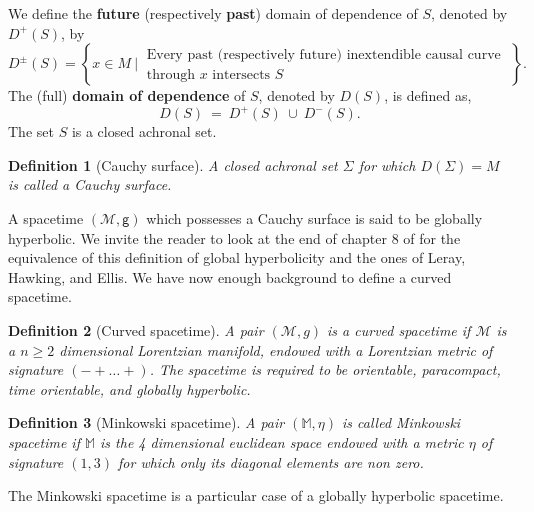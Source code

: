 \documentclass[11pt]{book}
\newcommand{\Mcal}{\mathcal{M}}
\newcommand{\Mbb}{\mathbb{M}}
\newcommand{\gsf}{\mathsf{g}}
\theoremstyle{break}
\newtheorem{definition}{Definition}[chapter]
\begin{document}


We define the \textbf{future} (respectively \textbf{past}) domain of dependence of $S$, denoted by $D^{+}(S)$, by
%
\begin{equation*}
D^{\pm}(S) = \left\{ x \in M \ \bigg| \ \begin{array}{l} \text{Every past (respectively future) inextendible causal curve} \\ \text{through $x$ intersects $S$} \end{array} \; \right\}.
\end{equation*}
%
The (full) \textbf{domain of dependence} of $S$, denoted by $D(S)$, is defined as,
\begin{equation*}
D(S) \ = \ D^{+}(S) \ \cup \ D^{-}(S).
\end{equation*}
The set $S$ is a closed achronal set.


\bigskip


\begin{definition}[Cauchy surface]
A closed achronal set $\Sigma$ for which $D(\Sigma) = M$ is called a Cauchy surface. 
\end{definition}

A spacetime $(\Mcal,\gsf)$ which possesses a Cauchy surface is said to be globally hyperbolic. We invite the reader to look at the end of chapter $8$ of \cite{waldGR} for the equivalence of this definition of global hyperbolicity and the ones of Leray, Hawking, and Ellis. 
We have now enough background to define a curved spacetime.

\begin{definition}[Curved spacetime]\label{def:cst}
A pair $(\Mcal,g)$ is a curved spacetime if $\Mcal$ is a $n \geq 2$ dimensional Lorentzian manifold, endowed with a Lorentzian metric of signature $( - + \dots +)$. The spacetime is required to be orientable, paracompact, time orientable, and globally hyperbolic. 
\end{definition}


\begin{definition}[Minkowski spacetime]\label{def:minkowski}
A pair $(\Mbb,\eta)$ is called Minkowski spacetime if $\Mbb$ is the 4 dimensional euclidean space endowed with a metric $\eta$ of signature $(1,3)$ for which only its diagonal elements are non zero.
\end{definition}


The Minkowski spacetime is a particular case of a globally hyperbolic spacetime. 
\end{document}

